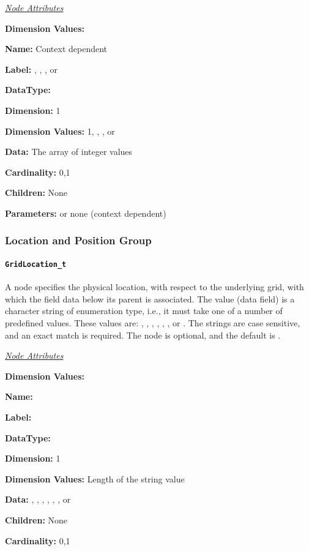 \textit{\uline{Node Attributes}}
\begin{Ventryic}{\textbf{Dimension Values:}}
\raggedright
\item [\textbf{Name:}]
      Context dependent
\item [\textbf{Label:}]
      , , ,
      or 
\item [\textbf{DataType:}]
\item [\textbf{Dimension:}]
      1
\item [\textbf{Dimension Values:}]
      1, , , or
\item [\textbf{Data:}]
      The array of integer values
\item [\textbf{Cardinality:}]
      0,1
\item [\textbf{Children:}]
      None
\item [\textbf{Parameters:}]
       or none (context dependent)
\end{Ventryic}

\subsubsection{Location and Position Group}

\paragraph{\texttt{GridLocation\_t}}

A  node specifies the physical location, with
respect to the underlying grid, with which the field data below
its parent is associated. The value (data field) is a character
string of enumeration type, i.e., it must take one of a number of
predefined values. These values are: , ,
, , ,
, or . The strings are case
sensitive, and an exact match is required. The 
node is optional, and the default is .

\newpage
\textit{\uline{Node Attributes}}
\begin{Ventryic}{\textbf{Dimension Values:}}
\raggedright
\item [\textbf{Name:}]
\item [\textbf{Label:}]
\item [\textbf{DataType:}]
\item [\textbf{Dimension:}]
      1
\item [\textbf{Dimension Values:}]
      Length of the string value
\item [\textbf{Data:}]
      , , , ,
      , , or 
\item [\textbf{Children:}]
      None
\item [\textbf{Cardinality:}]
      0,1
\end{Ventryic}

